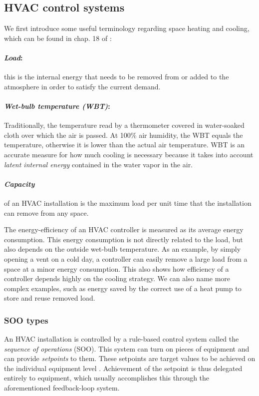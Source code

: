 \documentclass{article}
\theoremstyle{definition}
\theoremstyle{remark}
\begin{document}
\subsection{HVAC control systems}\label{theory:HVAC}
We first introduce some useful terminology regarding space heating and cooling, which can be found in chap. 18 of \cite{ashraeHandbook}:

\paragraph{\textit{Load}:} this is the internal energy that needs to be removed from or added to the atmosphere in order to satisfy the current demand.

\paragraph{\textit{Wet-bulb temperature (WBT)}:} Traditionally, the temperature read by a thermometer covered in water-soaked cloth over which the air is passed. At 100\% air humidity, the WBT equals the temperature, otherwise it is lower than the actual air temperature. WBT is an accurate measure for how much cooling is necessary because it takes into account \textit{latent internal energy} contained in the water vapor in the air.

\paragraph{\textit{Capacity}} of an HVAC installation is the maximum load per unit time that the installation can remove from any space.

The energy-efficiency of an HVAC controller is measured as its average energy consumption. This energy consumption is not directly related to the load, but also depends on the outside wet-bulb temperature. As an example, by simply opening a vent on a cold day, a controller can easily remove a large load from a space at a minor energy consumption. This also shows how efficiency of a controller depends highly on the cooling strategy. We can also name more complex examples, such as energy saved by the correct use of a heat pump to store and reuse removed load.

\subsubsection{SOO types}
An HVAC installation is controlled by a rule-based control system called the \textit{sequence of operations} (SOO). This system can turn on pieces of equipment and can provide \textit{setpoints} to them. These setpoints are target values to be achieved on the individual equipment level \cite{luo2022controlling}. Achievement of the setpoint is thus delegated entirely to equipment, which usually accomplishes this through the aforementioned feedback-loop system. 
\end{document}
